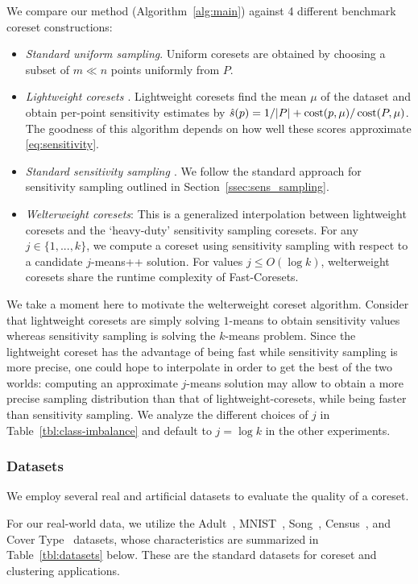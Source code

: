 We compare our method (Algorithm~\ref{alg:main}) against 4 different benchmark coreset constructions:
\begin{itemize}
        \item \emph{Standard uniform sampling}. Uniform coresets are obtained by choosing a subset of $m \ll n$ points uniformly from $P$.
        \item \emph{Lightweight coresets \cite{bachem2018scalable}}. Lightweight coresets find the mean $\mu$ of the dataset and obtain per-point sensitivity estimates by $\hat{s}(p) = 1/|P| + \operatorname{cost}(p, \mu) / \operatorname{cost}(P, \mu)$. The goodness of this algorithm depends on how well these scores approximate \cref{eq:sensitivity}.
        \item \emph{Standard sensitivity sampling \cite{LS10}}. We follow the standard approach for sensitivity sampling outlined in Section~\ref{ssec:sens_sampling}.
        \item \emph{Welterweight coresets}: This is a generalized interpolation between lightweight coresets and the `heavy-duty' sensitivity sampling coresets. For any $j
            \in \{1,..., k\}$, we compute a coreset using sensitivity sampling with respect to a candidate $j$-means++ solution. For values $j \leq O(\log k)$,
            welterweight coresets share the runtime complexity of Fast-Coresets.
\end{itemize}

We take a moment here to motivate the welterweight coreset algorithm.  Consider that lightweight coresets are simply solving $1$-means to obtain sensitivity
values whereas sensitivity sampling is solving the $k$-means problem. Since the lightweight coreset has the advantage of being fast while sensitivity sampling
is more precise, one could hope to interpolate in order to get the best of the two worlds: computing an approximate $j$-means solution may allow to obtain
a more precise sampling distribution than that of lightweight-coresets, while being faster than sensitivity sampling. We analyze the different choices of $j$ in
Table~\ref{tbl:class-imbalance} and default to $j = \log k$ in the other experiments.

\subsubsection{Datasets}

We employ several real and artificial datasets to evaluate the quality of a coreset. 

For our real-world data, we utilize the Adult~\cite{Dua:2019}, MNIST~\cite{mnist}, Song~\cite{song}, Census~\cite{census}, and Cover Type~\cite{covtype}
datasets, whose characteristics are summarized in Table~\ref{tbl:datasets} below. These are the standard datasets for coreset and clustering applications.

